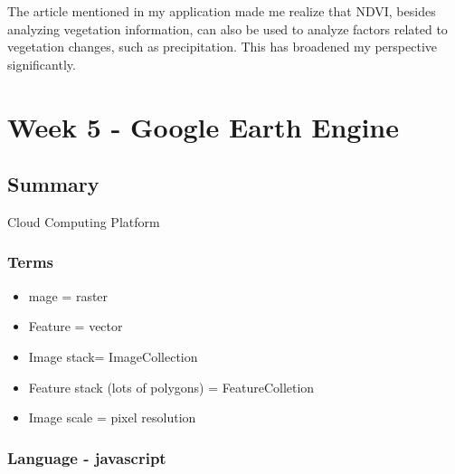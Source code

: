 \documentclass[
  letterpaper,
  DIV=11,
  numbers=noendperiod]{scrreprt}
\providecommand{\tightlist}{%
  \setlength{\itemsep}{0pt}\setlength{\parskip}{0pt}}\usepackage{longtable,booktabs,array}
\begin{document}
The article mentioned in my application made me realize that NDVI,
besides analyzing vegetation information, can also be used to analyze
factors related to vegetation changes, such as precipitation. This has
broadened my perspective significantly.


\hypertarget{week-5---google-earth-engine}{%
\chapter{Week 5 - Google Earth
Engine}\label{week-5---google-earth-engine}}

\hypertarget{summary-2}{%
\section{Summary}\label{summary-2}}

Cloud Computing Platform

\hypertarget{terms}{%
\subsection{Terms}\label{terms}}

\begin{itemize}
\tightlist
\item
  mage = raster
\item
  Feature = vector
\item
  Image stack= ImageCollection
\item
  Feature stack (lots of polygons) = FeatureColletion
\item
  Image scale = pixel resolution
\end{itemize}

\hypertarget{language---javascript}{%
\subsection{Language - javascript}\label{language---javascript}}
\end{document}
